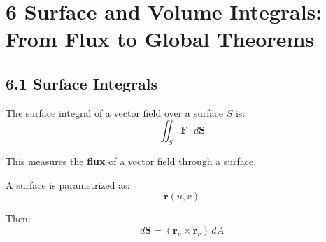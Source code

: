 \section*{6 Surface and Volume Integrals: From Flux to Global Theorems}

\subsection*{6.1 Surface Integrals}
\begin{conceptbox}
    The surface integral of a vector field over a surface $S$ is:
    \begin{equation*}
        \iint_S \mathbf{F} \cdot d\mathbf{S}
    \end{equation*}
\end{conceptbox}

This measures the \textbf{flux} of a vector field through a surface.

A surface is parametrized as:
\begin{equation*}
    \mathbf{r}(u,v)
\end{equation*}

Then:
\begin{equation*}
    d\mathbf{S} = (\mathbf{r}_u \times \mathbf{r}_v)\, dA
\end{equation*}

